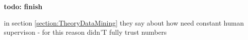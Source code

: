









\textbf{todo: finish}

in section \ref{section:TheoryDataMining} they say about how need constant human supervison - for this reason didn'T fully trust numbers